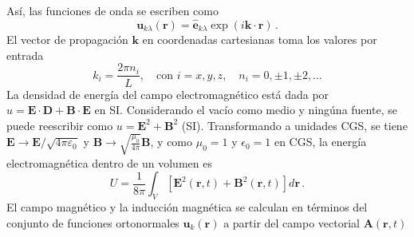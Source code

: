 Así, las funciones de onda se escriben como
\begin{equation}
  \label{EM.15}
  \mathbf{u}_{k\lambda}(\mathbf{r}) = \mathbf{\hat{e}}_{k\lambda} \exp\left({i\mathbf{k}\cdot \mathbf{r}}\right) \,.
\end{equation}
El vector de propagación $\mathbf{k}$ en coordenadas cartesianas toma los valores por entrada
\begin{equation}
  \label{EM.16}
  k_i = \frac{2\pi n_i}{L}, \quad \text{con } i=x,y,z , \quad n_i = 0, \pm1, \pm 2, \dots
\end{equation}
La densidad de energía del campo electromagnético está dada por $u = \mathbf{E} \cdot \mathbf{D} + \mathbf{B} \cdot \mathbf{E}$ en SI. Considerando el vacío como medio y ningúna fuente, se puede reescribir como $u = \mathbf{E}^2 + \mathbf{B}^2$ (SI). Transformando a unidades CGS, se tiene $\mathbf{E} \to \mathbf{E}/\sqrt{4\pi \varepsilon_0}$ y $\mathbf{B} \to \sqrt{\frac{\mu_0}{4\pi}}\mathbf{B}$, y como $\mu_0=1$ y $\epsilon_0 = 1$ en CGS, la energía electromagnética dentro de un volumen es
\begin{equation}
  \label{EM.17}
  U = \frac{1}{8\pi}\int_V \left[ \mathbf{E}^2(\mathbf{r}, t) + \mathbf{B}^2(\mathbf{r}, t) \right] d\mathbf{r} \,.
\end{equation}
El campo magnético y la inducción magnética se calculan en términos del conjunto de funciones ortonormales $\mathbf{u}_k(\mathbf{r})$ a partir del campo vectorial $\mathbf{A}(\mathbf{r}, t)$
